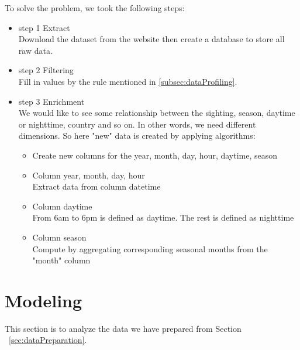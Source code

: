 \documentclass[11pt, journal]{IEEEtran}
\begin{document}
To solve the problem, we took the following steps:
\begin{itemize}
  \item step 1 Extract \\
  Download the dataset from the website then create a database to store all raw data.
  \item step 2 Filtering\\
  Fill in values by the rule mentioned in \ref{subsec:dataProfiling}.
  \item step 3 Enrichment\\
  We would like to see some relationship between the sighting, season, daytime or nighttime, country and so on. In other words, we need different dimensions. So here "new" data is created by applying algorithms:
  \begin{itemize}
      \item Create new columns for the year, month, day, hour, daytime, season
      \item Column year, month, day, hour\\
      Extract data from column datetime
      \item Column daytime\\
      From 6am to 6pm is defined as daytime. The rest is defined as nighttime
      \item Column season\\
      Compute by aggregating corresponding seasonal months from the "month" column
  \end{itemize}
  
\end{itemize}

\section{Modeling} \label{sec:modeling}
This section is to analyze the data we have prepared from Section ~\ref{sec:dataPreparation}.
\end{document}
